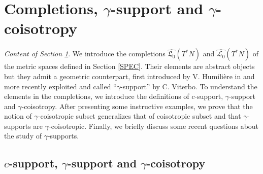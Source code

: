 \documentclass{article}
\newcommand{\1}{\mathbbm{1}}
\theoremstyle{remark}
\begin{document}
{{\section{Completions, \texorpdfstring{$\gamma$-support and $\gamma$-coisotropy}{gamma-support and gamma-coisotropy}} \label{sezione 4}
\begin{center}
\begin{minipage}{10 cm}
\textit{Content of Section \ref{sezione 4}}. We introduce the completions $\widehat{\mathfrak{L}_0}(T^*N)$ and $\widehat{\mathscr{L}_0}(T^*N)$ of the metric spaces defined in Section \ref{SPEC}. Their elements are abstract objects but they admit a geometric counterpart, first introduced by  V. Humilière in \cite{hum08} and more recently exploited and called ``$\gamma$-support'' by C. Viterbo. To understand the elements in the completions, we introduce the definitions of $c$-support, $\gamma$-support and $\gamma$-coisotropy. After presenting some instructive examples, we prove that the notion of $\gamma$-coisotropic subset generalizes that of coisotropic subset and that $\gamma$-supports are $\gamma$-coisotropic. Finally, we briefly discuss some recent questions about the study of $\gamma$-supports.
\end{minipage}
\end{center}

\subsection{\texorpdfstring{$c$-support}{c-support}, \texorpdfstring{$\gamma$-support and $\gamma$-coisotropy}{gamma-support and gamma-coisotropy}}

}}
\end{document}
